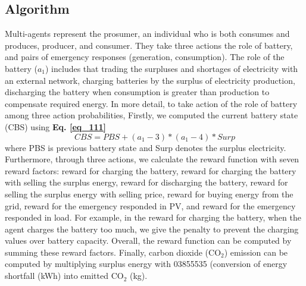 \documentclass[conference]{IEEEtran}
\begin{document}
\subsection{Algorithm}
Multi-agents represent the prosumer, an individual who is both consumes and produces, producer, and consumer. They take three actions the role of battery, and pairs of emergency responses (generation, consumption). The role of the battery ($a_1$) includes that trading the surpluses and shortages of electricity with an external network, charging batteries by the surplus of electricity production, discharging the battery when consumption is greater than production to compensate required energy. In more detail, to take action of the role of battery among three action probabilities, Firstly, we computed the current battery state (CBS) using \textbf{Eq. \eqref{eq_111}}
\begin{equation} \label{eq_111}
    CBS = PBS + (a_1 - 3 ) * (a_1 - 4) * Surp
\end{equation}
where PBS is previous battery state and Surp denotes the surplus electricity. Furthermore, through three actions, we calculate the reward function with seven reward factors: reward for charging the battery, reward for charging the battery with selling the surplus energy, reward for discharging the battery, reward for selling the surplus energy with selling price, reward for buying energy from the grid, reward for the emergency responded in PV, and reward for the emergency responded in load. For example, in the reward for charging the battery, when the agent charges the battery too much, we give the penalty to prevent the charging values over battery capacity. Overall, the reward function can be computed by summing these reward factors.
Finally, carbon dioxide (CO$_2$) emission can be computed by multiplying surplus energy with 03855535 (conversion of energy shortfall (kWh) into emitted CO$_2$ (kg). 
\end{document}
